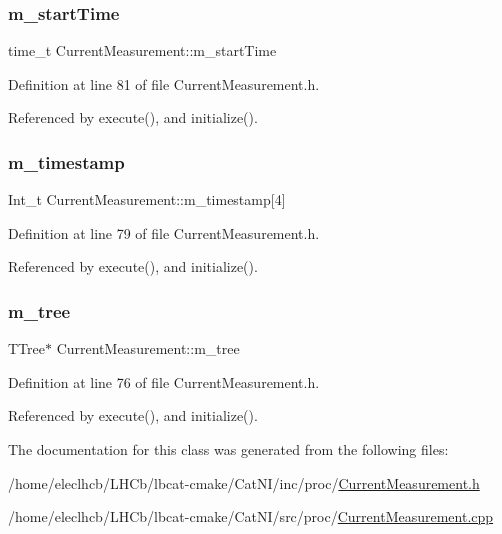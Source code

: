 \subsubsection{\texorpdfstring{m\+\_\+start\+Time}{m\_startTime}}
{\footnotesize\ttfamily time\+\_\+t Current\+Measurement\+::m\+\_\+start\+Time\hspace{0.3cm}{\ttfamily [private]}}



Definition at line 81 of file Current\+Measurement.\+h.



Referenced by execute(), and initialize().

\mbox{\label{classCurrentMeasurement_acc9f2cabf165e47a9fbf2a357e424cef}} 
\subsubsection{\texorpdfstring{m\+\_\+timestamp}{m\_timestamp}}
{\footnotesize\ttfamily Int\+\_\+t Current\+Measurement\+::m\+\_\+timestamp\mbox{[}4\mbox{]}\hspace{0.3cm}{\ttfamily [private]}}



Definition at line 79 of file Current\+Measurement.\+h.



Referenced by execute(), and initialize().

\mbox{\label{classCurrentMeasurement_a559823413932b393dedfc62d42268d93}} 
\subsubsection{\texorpdfstring{m\+\_\+tree}{m\_tree}}
{\footnotesize\ttfamily T\+Tree$\ast$ Current\+Measurement\+::m\+\_\+tree\hspace{0.3cm}{\ttfamily [private]}}



Definition at line 76 of file Current\+Measurement.\+h.



Referenced by execute(), and initialize().



The documentation for this class was generated from the following files\+:\begin{DoxyCompactItemize}
\item 
/home/eleclhcb/\+L\+H\+Cb/lbcat-\/cmake/\+Cat\+N\+I/inc/proc/\hyperlink{CurrentMeasurement_8h}{Current\+Measurement.\+h}\item 
/home/eleclhcb/\+L\+H\+Cb/lbcat-\/cmake/\+Cat\+N\+I/src/proc/\hyperlink{CurrentMeasurement_8cpp}{Current\+Measurement.\+cpp}\end{DoxyCompactItemize}
